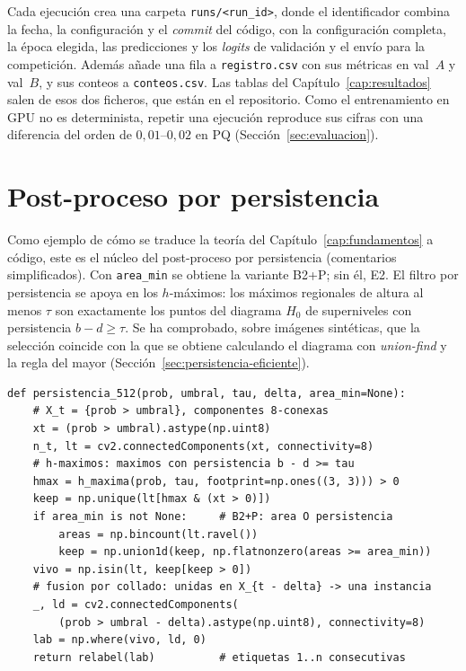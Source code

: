 Cada ejecución crea una carpeta \texttt{runs/<run\_id>}, donde el
identificador combina la fecha, la configuración y el \emph{commit} del
código, con la configuración completa, la época elegida, las
predicciones y los \emph{logits} de validación y el envío para la
competición. Además añade una fila a \texttt{registro.csv} con sus
métricas en val~$A$ y val~$B$, y sus conteos a \texttt{conteos.csv}. Las
tablas del Capítulo~\ref{cap:resultados} salen de esos dos ficheros, que
están en el repositorio. Como el entrenamiento en GPU no es determinista,
repetir una ejecución reproduce sus cifras con una diferencia del orden
de $0{,}01$--$0{,}02$ en PQ (Sección~\ref{sec:evaluacion}).

\section{Post-proceso por persistencia}

Como ejemplo de cómo se traduce la teoría del
Capítulo~\ref{cap:fundamentos} a código, este es el núcleo del
post-proceso por persistencia (comentarios simplificados). Con
\texttt{area\_min} se obtiene la variante B2+P; sin él, E2. El filtro por persistencia
se apoya en los $h$-máximos: los máximos regionales de altura al menos
$\tau$ son exactamente los puntos del diagrama $H_0$ de superniveles con
persistencia $b-d\ge\tau$. Se ha comprobado, sobre imágenes sintéticas,
que la selección coincide con la que se obtiene calculando el diagrama
con \emph{union-find} y la regla del mayor
(Sección~\ref{sec:persistencia-eficiente}).

\begin{small}
\begin{verbatim}
def persistencia_512(prob, umbral, tau, delta, area_min=None):
    # X_t = {prob > umbral}, componentes 8-conexas
    xt = (prob > umbral).astype(np.uint8)
    n_t, lt = cv2.connectedComponents(xt, connectivity=8)
    # h-maximos: maximos con persistencia b - d >= tau
    hmax = h_maxima(prob, tau, footprint=np.ones((3, 3))) > 0
    keep = np.unique(lt[hmax & (xt > 0)])
    if area_min is not None:     # B2+P: area O persistencia
        areas = np.bincount(lt.ravel())
        keep = np.union1d(keep, np.flatnonzero(areas >= area_min))
    vivo = np.isin(lt, keep[keep > 0])
    # fusion por collado: unidas en X_{t - delta} -> una instancia
    _, ld = cv2.connectedComponents(
        (prob > umbral - delta).astype(np.uint8), connectivity=8)
    lab = np.where(vivo, ld, 0)
    return relabel(lab)          # etiquetas 1..n consecutivas
\end{verbatim}
\end{small}
